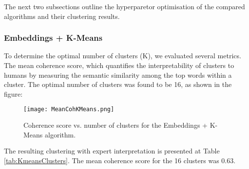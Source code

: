 


The next two subsections outline the hyperparetor optimisation of the compared algorithms and their clustering results.

\subsubsection{Embeddings + K-Means}
To determine the optimal number of clusters (K), we evaluated several metrics. The mean coherence score, which quantifies the interpretability of clusters to humans by measuring the semantic similarity among the top words within a cluster. The optimal number of clusters was found to be 16, as shown in the figure:

\begin{figure}[h] %
    \centering
    \texttt{[image: MeanCohKMeans.png]}
    \label{fig:MeanCohKMeans}
    \caption{Coherence score vs. number of clusters for the Embeddings + K-Means algorithm.}
\end{figure}

\newpage
The resulting clustering with expert interpretation is presented at Table  \ref{tab:KmeansClusters}. The mean coherence score for the 16 clusters was 0.63.


